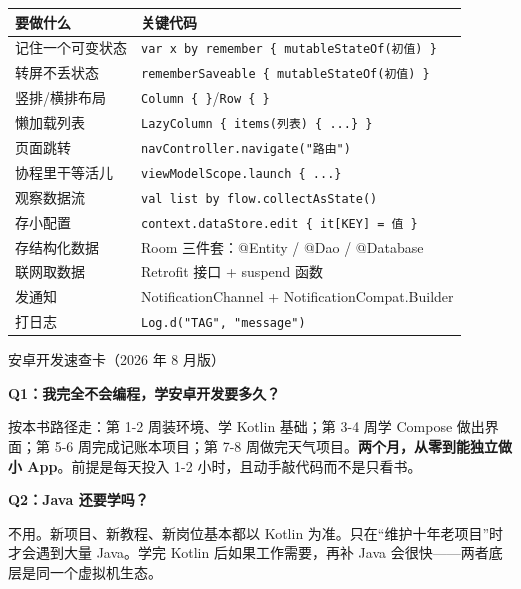 


\begin{center}
\begin{tabularx}{\linewidth}{|X|X|}
\hline
\textbf{要做什么} & \textbf{关键代码} \tabularnewline
\hline
记住一个可变状态 & \texttt{var x by remember \{ mutableStateOf(初值) \}} \tabularnewline
转屏不丢状态 & \texttt{rememberSaveable \{ mutableStateOf(初值) \}} \tabularnewline
竖排/横排布局 & \texttt{Column \{ \}}/\texttt{Row \{ \}} \tabularnewline
懒加载列表 & \texttt{LazyColumn \{ items(列表) \{ .\allowbreak .\allowbreak .\allowbreak  \} \}} \tabularnewline
页面跳转 & \texttt{navController.\allowbreak navigate("路由")} \tabularnewline
协程里干等活儿 & \texttt{viewModelScope.\allowbreak launch \{ .\allowbreak .\allowbreak .\allowbreak  \}} \tabularnewline
观察数据流 & \texttt{val list by flow.\allowbreak collectAsState()} \tabularnewline
存小配置 & \texttt{context.\allowbreak dataStore.\allowbreak edit \{ it[KEY] = 值 \}} \tabularnewline
存结构化数据 & Room 三件套：@Entity / @Dao / @Database \tabularnewline
联网取数据 & Retrofit 接口 + suspend 函数 \tabularnewline
发通知 & NotificationChannel + NotificationCompat.Builder \tabularnewline
打日志 & \texttt{Log.\allowbreak d("TAG", "message")} \tabularnewline
\hline
\end{tabularx}
\end{center}

\begin{center}\small\color{gray}安卓开发速查卡（2026 年 8 月版）\end{center}


\textbf{Q1：我完全不会编程，学安卓开发要多久？}

按本书路径走：第 1-2 周装环境、学 Kotlin 基础；第 3-4 周学 Compose 做出界面；第 5-6 周完成记账本项目；第 7-8 周做完天气项目。\textbf{两个月，从零到能独立做小 App}。前提是每天投入 1-2 小时，且动手敲代码而不是只看书。

\textbf{Q2：Java 还要学吗？}

不用。新项目、新教程、新岗位基本都以 Kotlin 为准。只在“维护十年老项目”时才会遇到大量 Java。学完 Kotlin 后如果工作需要，再补 Java 会很快——两者底层是同一个虚拟机生态。

